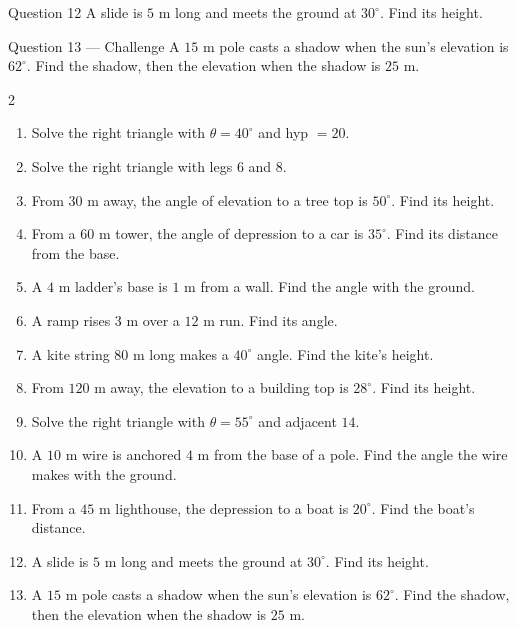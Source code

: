 \documentclass[11pt]{article}
\begin{document}
\begin{qbox}{Question 12}
A slide is $5$ m long and meets the ground at $30^\circ$. Find its height.\workspace{2.2cm}
\end{qbox}

\begin{qbox}{Question 13 --- Challenge}
A $15$ m pole casts a shadow when the sun's elevation is $62^\circ$. Find the shadow, then the elevation when the shadow is $25$ m.\workspace{3.2cm}
\end{qbox}

\clearpage
{}

\begin{recapbox}
\begin{multicols}{2}
\small
\begin{enumerate}[leftmargin=*,itemsep=3pt]
  \item Solve the right triangle with $\theta=40^\circ$ and hyp $=20$.
  \item Solve the right triangle with legs $6$ and $8$.
  \item From $30$ m away, the angle of elevation to a tree top is $50^\circ$. Find its height.
  \item From a $60$ m tower, the angle of depression to a car is $35^\circ$. Find its distance from the base.
  \item A $4$ m ladder's base is $1$ m from a wall. Find the angle with the ground.
  \item A ramp rises $3$ m over a $12$ m run. Find its angle.
  \item A kite string $80$ m long makes a $40^\circ$ angle. Find the kite's height.
  \item From $120$ m away, the elevation to a building top is $28^\circ$. Find its height.
  \item Solve the right triangle with $\theta=55^\circ$ and adjacent $14$.
  \item A $10$ m wire is anchored $4$ m from the base of a pole. Find the angle the wire makes with the ground.
  \item From a $45$ m lighthouse, the depression to a boat is $20^\circ$. Find the boat's distance.
  \item A slide is $5$ m long and meets the ground at $30^\circ$. Find its height.
  \item A $15$ m pole casts a shadow when the sun's elevation is $62^\circ$. Find the shadow, then the elevation when the shadow is $25$ m.
\end{enumerate}
\end{multicols}
\end{recapbox}
\end{document}
